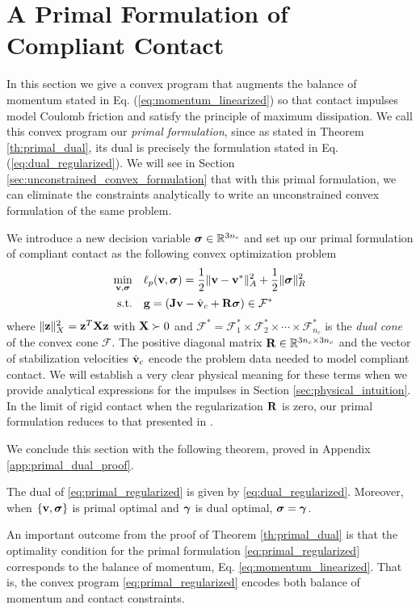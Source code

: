 
\section{A Primal Formulation of Compliant Contact}
\label{sec:primal_formulation}

In this section we give a convex program that augments the balance of momentum
stated in Eq. (\ref{eq:momentum_linearized}) so that contact impulses model
Coulomb friction and satisfy the principle of maximum dissipation.
We call this convex program our \emph{primal formulation}, since as stated in Theorem \ref{th:primal_dual},
its dual is precisely the formulation stated in Eq.
(\ref{eq:dual_regularized}). We will see in Section
\ref{sec:unconstrained_convex_formulation} that with this primal formulation,
we can eliminate the constraints analytically to write an unconstrained convex
formulation of the same problem.

We introduce a new decision variable ${\bm{\sigma}}\in\mathbb{R}^{3n_c}$ and
set up our primal formulation of compliant contact as the following convex
optimization problem
\begin{equation}
	\begin{aligned}
	\min_{\mf{v},\bsigma} \quad & \ell_p(\mf{v},\bsigma) =
	\frac{1}{2}\Vert\mf{v}-\mf{v}^*\Vert_{A}^2 +
	\frac{1}{2} \Vert\bsigma\Vert_{R}^2\\
	\textrm{s.t.} \quad & \mf{g} = (\mf{J}\mf{v}-\hat{\mf{v}}_c + \mf{R}\bsigma) \in \mathcal{F}^*\\
	\end{aligned}
	\label{eq:primal_regularized}
\end{equation}
where $\Vert{\mathbf{z}}\Vert_X^2={\mathbf{z}}^T{\mathbf{X}}{\mathbf{z}}$ with ${\mathbf{X}}\succ 0$ and
$\mathcal{F^*}= \mathcal{F}^*_1 \times \mathcal{F}^*_2 \times \cdots \times
\mathcal{F}^*_{n_c}$ is the \emph{dual cone} of the convex cone $\mathcal{F}$.
The positive diagonal matrix ${\mathbf{R}}\in\mathbb{R}^{3n_c\times 3n_c}$ and the
vector of stabilization velocities $\hat{{\mathbf{v}}}_c$ encode the problem data
needed to model compliant contact. We will establish a very clear physical
meaning for these terms when we provide analytical expressions for the impulses
in Section \ref{sec:physical_intuition}. In the limit of rigid contact
when the regularization ${\mathbf{R}}$ is zero, our primal formulation reduces to that
presented in \cite{bib:mazhar2014}.

We conclude this section with the following theorem, proved in Appendix \ref{app:primal_dual_proof}.

\begin{theorem}\label{th:primal_dual}
The dual of \eqref{eq:primal_regularized} is given by 
\eqref{eq:dual_regularized}. Moreover, when $\{{\mathbf{v}},{\bm\sigma}\}$ is primal optimal and
${\bm\gamma}$ is dual optimal, ${\bm\sigma} = {\bm\gamma}$.
\end{theorem}

An important outcome from the proof of Theorem \ref{th:primal_dual} is
that the optimality condition for the primal formulation
\eqref{eq:primal_regularized} corresponds to the balance of momentum, Eq.
\eqref{eq:momentum_linearized}. That is, the convex program
\eqref{eq:primal_regularized} encodes both balance of momentum and contact
constraints.